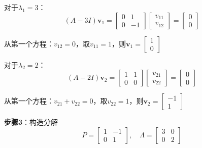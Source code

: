 \documentclass[12pt,a4paper]{article}
\begin{document}
对于$\lambda_1 = 3$：
\begin{equation}
(A - 3I)\bm{v}_1 = \begin{bmatrix} 0 & 1 \\ 0 & -1 \end{bmatrix} \begin{bmatrix} v_{11} \\ v_{12} \end{bmatrix} = \begin{bmatrix} 0 \\ 0 \end{bmatrix}
\end{equation}

从第一个方程：$v_{12} = 0$，取$v_{11} = 1$，则$\bm{v}_1 = \begin{bmatrix} 1 \\ 0 \end{bmatrix}$

对于$\lambda_2 = 2$：
\begin{equation}
(A - 2I)\bm{v}_2 = \begin{bmatrix} 1 & 1 \\ 0 & 0 \end{bmatrix} \begin{bmatrix} v_{21} \\ v_{22} \end{bmatrix} = \begin{bmatrix} 0 \\ 0 \end{bmatrix}
\end{equation}

从第一个方程：$v_{21} + v_{22} = 0$，取$v_{22} = 1$，则$\bm{v}_2 = \begin{bmatrix} -1 \\ 1 \end{bmatrix}$

\textbf{步骤3}：构造分解
\begin{equation}
P = \begin{bmatrix} 1 & -1 \\ 0 & 1 \end{bmatrix}, \quad
\Lambda = \begin{bmatrix} 3 & 0 \\ 0 & 2 \end{bmatrix}
\end{equation}
\end{document}
